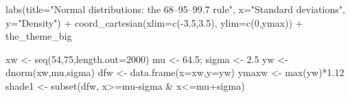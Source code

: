 \documentclass[
  letterpaper,
  DIV=11,
  numbers=noendperiod]{scrreprt}
\newenvironment{Shaded}{\begin{snugshade}}{\end{snugshade}}
\newcommand{\AttributeTok}[1]{\textcolor[rgb]{0.40,0.45,0.13}{#1}}
\newcommand{\DecValTok}[1]{\textcolor[rgb]{0.68,0.00,0.00}{#1}}
\newcommand{\FloatTok}[1]{\textcolor[rgb]{0.68,0.00,0.00}{#1}}
\newcommand{\FunctionTok}[1]{\textcolor[rgb]{0.28,0.35,0.67}{#1}}
\newcommand{\NormalTok}[1]{\textcolor[rgb]{0.00,0.23,0.31}{#1}}
\newcommand{\OtherTok}[1]{\textcolor[rgb]{0.00,0.23,0.31}{#1}}
\newcommand{\SpecialCharTok}[1]{\textcolor[rgb]{0.37,0.37,0.37}{#1}}
\newcommand{\StringTok}[1]{\textcolor[rgb]{0.13,0.47,0.30}{#1}}
\begin{document}
\begin{Shaded}
\begin{Highlighting}[]
  \FunctionTok{labs}\NormalTok{(}\AttributeTok{title=}\StringTok{"Normal distributions: the 68–95–99.7 rule"}\NormalTok{, }\AttributeTok{x=}\StringTok{"Standard deviations"}\NormalTok{, }\AttributeTok{y=}\StringTok{"Density"}\NormalTok{) }\SpecialCharTok{+}
  \FunctionTok{coord\_cartesian}\NormalTok{(}\AttributeTok{xlim=}\FunctionTok{c}\NormalTok{(}\SpecialCharTok{{-}}\FloatTok{3.5}\NormalTok{,}\FloatTok{3.5}\NormalTok{), }\AttributeTok{ylim=}\FunctionTok{c}\NormalTok{(}\DecValTok{0}\NormalTok{,ymax)) }\SpecialCharTok{+}
\NormalTok{  the\_theme\_big}

\NormalTok{xw }\OtherTok{\textless{}{-}} \FunctionTok{seq}\NormalTok{(}\DecValTok{54}\NormalTok{,}\DecValTok{75}\NormalTok{,}\AttributeTok{length.out=}\DecValTok{2000}\NormalTok{)}
\NormalTok{mu }\OtherTok{\textless{}{-}} \FloatTok{64.5}\NormalTok{; sigma }\OtherTok{\textless{}{-}} \FloatTok{2.5}
\NormalTok{yw }\OtherTok{\textless{}{-}} \FunctionTok{dnorm}\NormalTok{(xw,mu,sigma)}
\NormalTok{dfw }\OtherTok{\textless{}{-}} \FunctionTok{data.frame}\NormalTok{(}\AttributeTok{x=}\NormalTok{xw,}\AttributeTok{y=}\NormalTok{yw)}
\NormalTok{ymaxw }\OtherTok{\textless{}{-}} \FunctionTok{max}\NormalTok{(yw)}\SpecialCharTok{*}\FloatTok{1.12}
\NormalTok{shade1 }\OtherTok{\textless{}{-}} \FunctionTok{subset}\NormalTok{(dfw, x}\SpecialCharTok{\textgreater{}=}\NormalTok{mu}\SpecialCharTok{{-}}\NormalTok{sigma }\SpecialCharTok{\&}\NormalTok{ x}\SpecialCharTok{\textless{}=}\NormalTok{mu}\SpecialCharTok{+}\NormalTok{sigma)}


\end{Highlighting}
\end{Shaded}
\end{document}
